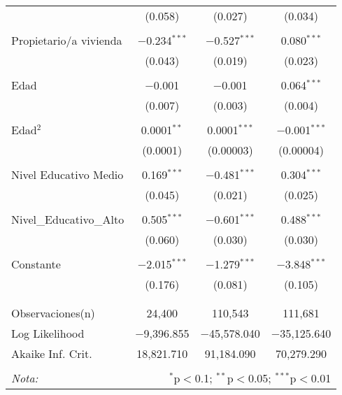 \documentclass[10pt,a4paper]{book}
\begin{document}
\begin{table}[!htbp]
\begin{tabular}{@{\extracolsep{5pt}}lccc}
  & (0.058) & (0.027) & (0.034) \\
  & & & \\ 
 Propietario/a vivienda & $-$0.234$^{***}$ & $-$0.527$^{***}$ & 0.080$^{***}$ \\ 
  & (0.043) & (0.019) & (0.023) \\ 
  & & & \\ 
 Edad & $-$0.001 & $-$0.001 & 0.064$^{***}$ \\ 
  & (0.007) & (0.003) & (0.004) \\ 
  & & & \\ 
 Edad$^2$ & 0.0001$^{**}$ & 0.0001$^{***}$ & $-$0.001$^{***}$ \\ 
  & (0.0001) & (0.00003) & (0.00004) \\ 
  & & & \\ 
 Nivel Educativo Medio & 0.169$^{***}$ & $-$0.481$^{***}$ & 0.304$^{***}$ \\ 
  & (0.045) & (0.021) & (0.025) \\ 
  & & & \\ 
 Nivel\_Educativo\_Alto & 0.505$^{***}$ & $-$0.601$^{***}$ & 0.488$^{***}$ \\ 
  & (0.060) & (0.030) & (0.030) \\ 
  & & & \\ 
 Constante & $-$2.015$^{***}$ & $-$1.279$^{***}$ & $-$3.848$^{***}$ \\ 
  & (0.176) & (0.081) & (0.105) \\ 
  & & & \\ 
\hline \\[-1.8ex] 
Observaciones(n) & 24,400 & 110,543 & 111,681 \\ 
Log Likelihood & $-$9,396.855 & $-$45,578.040 & $-$35,125.640 \\ 
Akaike Inf. Crit. & 18,821.710 & 91,184.090 & 70,279.290 \\ 
\hline 
\hline \\[-1.8ex] 
\textit{Nota:}  & \multicolumn{3}{r}{$^{*}$p$<$0.1; $^{**}$p$<$0.05; $^{***}$p$<$0.01} \\ 
\end{tabular} 
\end{table} 
\end{document}
